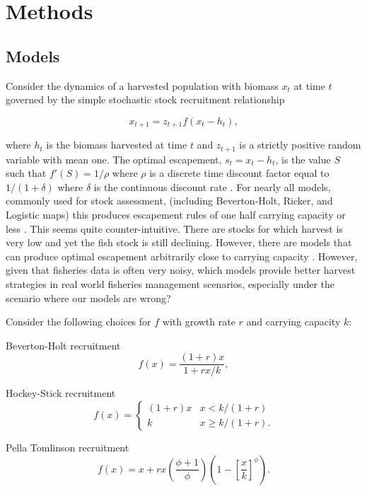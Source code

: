\documentclass[]{elsarticle} %
\begin{document}
\section{Methods}
\subsection{Models}
Consider the dynamics of a harvested population with biomass $x_t$ at time $t$ governed by the simple stochastic stock recruitment relationship

\begin{equation}
x_{t+1} = z_{t+1}f(x_t  - h_t),
\end{equation}

where $h_t$ is the biomass harvested at time $t$ and $z_{t+1}$ is a strictly positive random variable with mean one. The optimal escapement, $s_t = x_t  - h_t$, is the value $S$ such that $f'(S)=1/\rho$ where $\rho$ is a discrete time discount factor equal to $1/(1+\delta)$ where $\delta$ is the continuous discount rate \cite{Reed1979}. For nearly all models, commonly used for stock assessment, (including Beverton-Holt, Ricker, and Logistic maps) this produces escapement rules of one half carrying capacity or less \cite{Reed1979,Clark2010}. This seems quite counter-intuitive. There are stocks for which harvest is very low and yet the fish stock is still declining. However, there are models that can produce optimal escapement arbitrarily close to carrying capacity \cite{pella1969}. However, given that fisheries data is often very noisy, which models provide better harvest strategies in real world fisheries management scenarios, especially under the scenario where our models are wrong? 


Consider the following choices for $f$ with growth rate $r$ and carrying capacity $k$: 

Beverton-Holt recruitment
\begin{equation}\label{BH}
f(x) = \frac{(1+r)x}{1 + rx/k}, 
\end{equation}

Hockey-Stick recruitment
\begin{equation}\label{HS}
f(x) = \begin{cases} 
(1+r)x & x < k/(1+r) \\
k & x\geq k/(1+r).
\end{cases}
\end{equation}

Pella Tomlinson recruitment
\begin{equation}\label{SA}
f(x) = x + rx\left(\frac{\phi+1}{\phi}\right)\left(1 - \left[\frac{x}{k}\right]^\phi\right). 
\end{equation}
\end{document}
